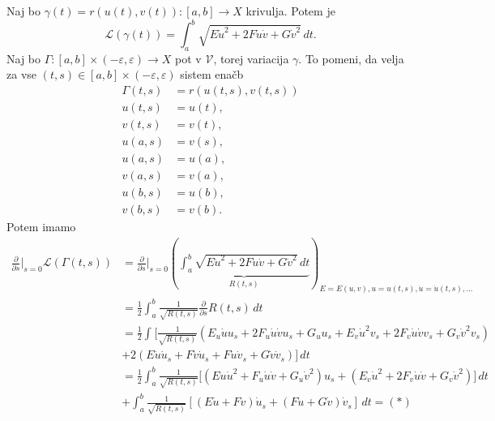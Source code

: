 Naj bo $\gamma(t) = r(u(t), v(t)): [a,b] \to X$ krivulja. Potem je \begin{equation*}
\mathcal{L}(\gamma(t)) = \int_{a}^{b} \sqrt{E\dot{u}^2 + 2F\dot{u}\dot{v} + G\dot{v}^2}  \, dt. 
\end{equation*}  
Naj bo $\Gamma : [a,b] \times  (-\varepsilon, \varepsilon) \to  X$ pot v $\mathcal{V}$, torej variacija $\gamma$. To pomeni, da velja za vse $(t,s) \in [a,b] \times  (-\varepsilon, \varepsilon)$ sistem enačb
\begin{align*}
    \Gamma(t,s) &= r(u(t,s), v(t,s)) \\
     u(t,s) &= u(t), \\
     v(t,s) &= v(t), \\
     u(a,s) &= v(s), \\
     u(a,s) &= u(a), \\
     v(a,s) &= v(a), \\
     u(b,s) &= u(b), \\
     v(b,s) &= v(b). 
\end{align*}
Potem imamo \begin{align*}
    \frac{ \partial  }{ \partial s} \bigg|_{s = 0} \mathcal{L}(\Gamma(t,s))  &= \frac{ \partial  }{ \partial s } \bigg|_{s = 0}  \left(\underbrace{\int_{a}^{b} \sqrt{E\dot{u}^2 + 2F\dot{u}\dot{v} + G\dot{v}^2}  \, dt }_{R(t,s)}\right)_{E = E(u,v), u = u(t,s), \dot{u} = \dot{u}(t,s), \ldots} \\
    &=  \frac{1}{2} \int_{a}^{b} \frac{1}{\sqrt{R(t,s)}} \frac{ \partial  }{ \partial s } R(t,s)  \, dt \\
    &=  \frac{1}{2} \int_{} \bigg[\frac{1}{\sqrt{R(t,s)}} (E_u \dot{u} u_s + 2F_u \dot{u} \dot{v} u_s + G_u u_s + E_v \dot{u}^2 v_s + 2F_v \dot{u} \dot{v} v_s + G_v \dot{v}^2 v_s) \\
    &+  2(E \dot{u} \dot{u}_s + F \dot{v} \dot{u}_s + F\dot{u} \dot{v}_s + G \dot{v} \dot{v}_s) \bigg] \, dt \\
    &= \frac{1}{2} \int_{a}^{b}  \frac{1}{\sqrt{R(t,s)}} \bigg[ (Eu \dot{u}^2 + F_u \dot{u} \dot{v} + G_u \dot{v}^2) u_s + (E_v \dot{u}^2 + 2F_v \dot{u} \dot{v} + G_v \dot{v}^2) \bigg] \, dt \\
    &+ \int_{a}^{b} \frac{1}{\sqrt{R(t,s)}} [(E\dot{u} + F\dot{v})\dot{u}_s + (F\dot{u} + G\dot{v}) \dot{v}_s] \, dt = (*)
\end{align*}  

